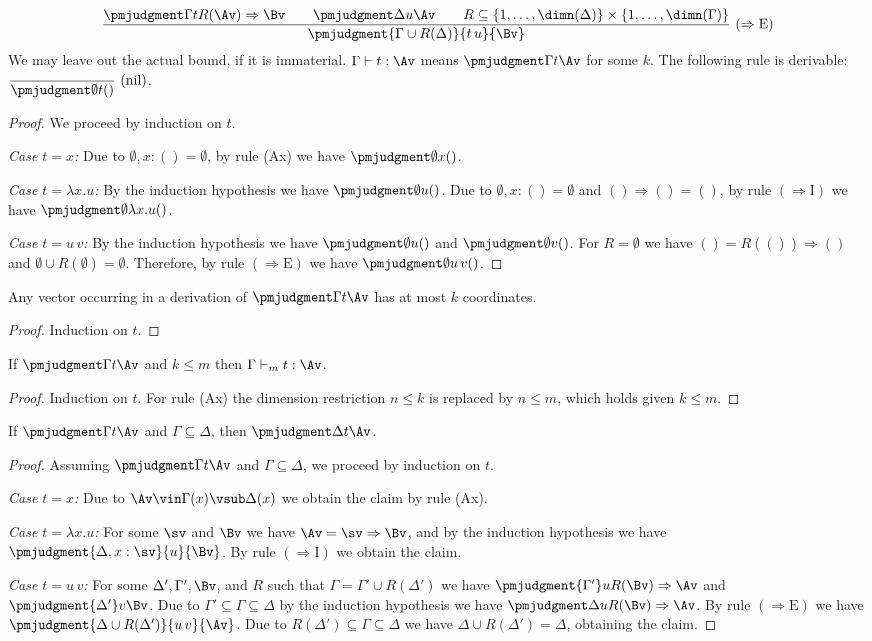 \[\frac{\pmjudgment\Gamma t{R(\Av)\Rightarrow\Bv}\qquad\pmjudgment\Delta u\Av\qquad R\subseteq\{1,\ldots,\dimn(\Delta)\}\times\{1,\ldots,\dimn(\Gamma)\}}{\pmjudgment{\Gamma\cup R(\Delta)}{t\,u}{\Bv}}\ (\Rightarrow\mathrm E)\]
We may leave out the actual bound, if it is immaterial.
 $\Gamma\vdash t:\Av$ means $\pmjudgment\Gamma t\Av$ for some $k$.
 The following rule is derivable: $\displaystyle\frac{}{\pmjudgment\emptyset t{()}}\ (\mathrm{nil})$.
\begin{proof}
We proceed by induction on $t$.\par
\emph{Case $t=x$:} Due to $\emptyset,x:()=\emptyset$, by rule (Ax) we have $\pmjudgment\emptyset x{()}$.\par
\emph{Case $t=\lambda x.u$:} By the induction hypothesis we have $\pmjudgment\emptyset u{()}$. Due to $\emptyset,x:()=\emptyset$ and $()\Rightarrow()=()$, by rule $(\Rightarrow\mathrm I)$ we have $\pmjudgment\emptyset{\lambda x.u}{()}$.\par
\emph{Case $t=u\,v$:} By the induction hypothesis we have $\pmjudgment\emptyset u{()}$ and $\pmjudgment\emptyset v{()}$. For $R=\emptyset$ we have $()=R(())\Rightarrow()$ and $\emptyset\cup R(\emptyset)=\emptyset$. Therefore, by rule $(\Rightarrow\mathrm E)$ we have $\pmjudgment\emptyset{u\,v}{()}$.
\end{proof}
 Any vector occurring in a derivation of $\pmjudgment\Gamma t\Av$ has at most $k$ coordinates.
\begin{proof}Induction on $t$.\end{proof}
 If $\pmjudgment\Gamma t\Av$ and $k\leq m$ then $\Gamma\vdash_m t:\Av$.
\begin{proof}Induction on $t$. For rule (Ax) the dimension restriction $n\leq k$ is replaced by $n\leq m$, which holds given $k\leq m$.\end{proof}
 If $\pmjudgment\Gamma t\Av$ and $\Gamma\subseteq\Delta$, then $\pmjudgment\Delta t\Av$.
\begin{proof}
Assuming $\pmjudgment\Gamma t\Av$ and $\Gamma\subseteq\Delta$, we proceed by induction on $t$.\par
\emph{Case $t=x$:} Due to $\Av\vin\Gamma(x)\vsub\Delta(x)$ we obtain the claim by rule (Ax).\par
\emph{Case $t=\lambda x.u$:} For some $\sv$ and $\Bv$ we have $\Av=\sv\Rightarrow\Bv$, and by the induction hypothesis we have $\pmjudgment{\Delta,x:\sv}{u}{\Bv}$. By rule $(\Rightarrow\mathrm I)$ we obtain the claim.\par
\emph{Case $t=u\,v$:} For some $\Delta',\Gamma',\Bv$, and $R$ such that $\Gamma=\Gamma'\cup R(\Delta')$ we have $\pmjudgment{\Gamma'}u{R(\Bv)\Rightarrow\Av}$ and $\pmjudgment{\Delta'}v\Bv$. Due to $\Gamma'\subseteq\Gamma\subseteq\Delta$ by the induction hypothesis we have $\pmjudgment\Delta u{R(\Bv)\Rightarrow\Av}$. By rule $(\Rightarrow\mathrm E)$ we have $\pmjudgment{\Delta\cup R(\Delta')}{u\,v}{\Av}$. Due to $R(\Delta')\subseteq\Gamma\subseteq\Delta$ we have $\Delta\cup R(\Delta')=\Delta$, obtaining the claim.
\end{proof}
